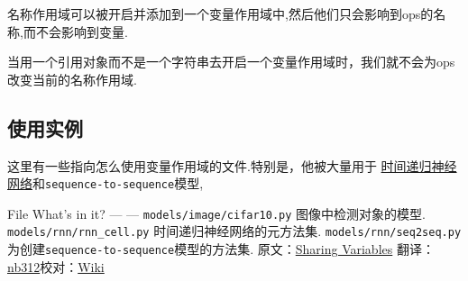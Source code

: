 \begin{Shaded}
\begin{Highlighting}[]
 \NormalTok{):}
    \OperatorTok{=}  \OperatorTok{+} \NormalTok{, [}\NormalTok{])}
 \OperatorTok{==} 
\end{Highlighting}
\end{Shaded}

名称作用域可以被开启并添加到一个变量作用域中,然后他们只会影响到ops的名称,而不会影响到变量.

\begin{Shaded}
\begin{Highlighting}[]
 \NormalTok{):}
     \NormalTok{):}
        \OperatorTok{=} \NormalTok{, [}\NormalTok{])}
        \OperatorTok{=}  \OperatorTok{+} 
 \OperatorTok{==} 
 \OperatorTok{==} 
\end{Highlighting}
\end{Shaded}

当用一个引用对象而不是一个字符串去开启一个变量作用域时，我们就不会为ops改变当前的名称作用域.

\subsection{使用实例 }\label{ux4f7fux7528ux5b9eux4f8b}

这里有一些指向怎么使用变量作用域的文件.特别是，他被大量用于
\href{https://zh.wikipedia.org/wiki/\%E9\%80\%92\%E5\%BD\%92\%E7\%A5\%9E\%E7\%BB\%8F\%E7\%BD\%91\%E7\%BB\%9C}{时间递归神经网络}和\texttt{sequence-to-sequence}模型,

File \textbar{} What's in it? --- \textbar{} ---
\texttt{models/image/cifar10.py} \textbar{}图像中检测对象的模型.
\texttt{models/rnn/rnn\_cell.py} \textbar{}时间递归神经网络的元方法集.
\texttt{models/rnn/seq2seq.py}
\textbar{}为创建\texttt{sequence-to-sequence}模型的方法集.
原文：\href{http://www.tensorflow.org/how_tos/variable_scope/index.md}{Sharing
Variables}
翻译：\href{https://github.com/nb312}{nb312}校对：\href{https://github.com/jikexueyuanwiki}{Wiki}